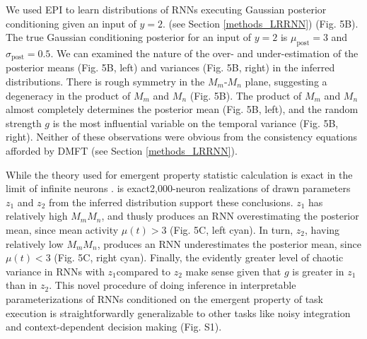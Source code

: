 \documentclass[11pt]{article}
\begin{document}
We used EPI to learn distributions of RNNs executing Gaussian posterior conditioning given an input of $y=2$. (see Section \ref{methods_LRRNN}) (Fig. 5B). The true Gaussian conditioning posterior for an input of $y=2$ is $\mu_{\text{post}}=3$ and $\sigma_{\text{post}} = 0.5$.   We can examined the nature of the over- and under-estimation of the posterior means (Fig. 5B, left) and variances (Fig. 5B, right) in the inferred distributions.  There is rough symmetry in the $M_m$-$M_n$ plane, suggesting a degeneracy in the product of $M_m$ and $M_n$ (Fig. 5B).  
The product of $M_m$ and $M_n$ almost completely determines the posterior mean (Fig. 5B, left), and the random strength $g$ is the most influential variable on the temporal variance (Fig. 5B, right).
Neither of these observations were obvious from the consistency equations afforded by DMFT (see Section \ref{methods_LRRNN}).

While the theory used for emergent property statistic calculation is exact in the limit of infinite neurons \cite{mastrogiuseppe2018linking}. is exact2,000-neuron realizations of drawn parameters $z_1$ and $z_2$ from the inferred distribution support these conclusions.  $z_1$ has relatively high $M_m M_n$, and thusly produces an RNN overestimating the posterior mean, since mean activity $\mu(t) > 3$  (Fig. 5C, left cyan).  In turn, $z_2$, having relatively low $M_m M_n$, produces an RNN underestimates the posterior mean, since $\mu(t) < 3$ (Fig. 5C, right cyan).  Finally, the evidently greater level of chaotic variance in RNNs with $z_1$compared to $z_2$ make sense given that $g$ is greater in $z_1$ than in $z_2$. This novel procedure of doing inference in interpretable parameterizations of RNNs conditioned on the emergent property of task execution is straightforwardly generalizable to other tasks like noisy integration and context-dependent decision making (Fig. S1).
\end{document}
